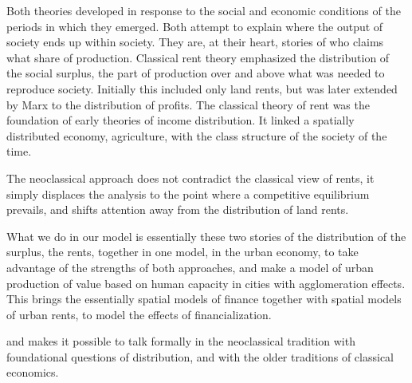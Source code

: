 Both theories developed in response to the social and economic conditions of the periods in which they emerged. Both attempt to explain where the output of society ends up within society. They are, at their heart, stories of who %
claims what share of production. Classical rent theory emphasized the distribution of the social \gls{surplus}, the part of production over and above what was needed to reproduce society. Initially this included only land rents, but was later extended by Marx to the distribution of profits.
The classical theory of rent was the foundation of early %
theories of income distribution. It linked a spatially distributed economy, agriculture, with the class structure of the society of the time. 


The neoclassical approach does not contradict the classical view of rents, it simply displaces the analysis to the point where a competitive equilibrium prevails, and shifts attention away from the distribution of land rents. %

What we do in our model is essentially these two stories of the distribution of the surplus, the rents, together in one model, in the urban economy, to take advantage of the strengths of both approaches, and make a model of %
urban production of value based on human capacity in cities with agglomeration effects. 
This brings the essentially spatial models of finance together with spatial models of urban rents, to model the effects of financialization. 

and makes it possible to talk formally in the neoclassical tradition with foundational questions of distribution, and with the older traditions of classical economics. 




